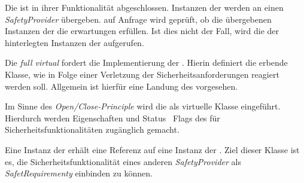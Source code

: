 

Die  ist in ihrer Funktionalität abgeschlossen.
Instanzen der  werden an einen \textit{SafetyProvider} übergeben. auf Anfrage wird geprüft, ob die übergebenen Instanzen der  die erwartungen erfüllen. Ist dies nicht der Fall, wird die  der hinterlegten Instanzen der  aufgerufen.


Die \textit{full virtual}  fordert die Implementierung der . Hierin definiert die erbende Klasse, wie in Folge einer Verletzung der Sicherheitsanforderungen reagiert werden soll. Allgemein ist hierfür eine Landung des \Quad[s] vorgesehen.


Im Sinne des \textit{Open/Close-Principle} wird die  als virtuelle Klasse eingeführt. Hierdurch werden Eigenschaften und Status \bzw\ Flags des \Quad[s] für Sicherheitsfunktionalitäten zugänglich gemacht.


Eine Instanz der  erhält eine Referenz auf eine Instanz der . Ziel dieser Klasse ist es, die Sicherheitsfunktionalität eines anderen \textit{SafetyProvider} als \textit{SafetRequirementy} einbinden zu können.


